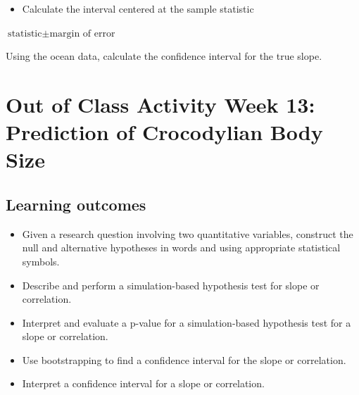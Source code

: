 \documentclass[
]{report}
\newenvironment{Shaded}{\begin{snugshade}}{\end{snugshade}}
\newcommand{\AttributeTok}[1]{\textcolor[rgb]{0.77,0.63,0.00}{#1}}
\newcommand{\CommentTok}[1]{\textcolor[rgb]{0.56,0.35,0.01}{\textit{#1}}}
\newcommand{\DecValTok}[1]{\textcolor[rgb]{0.00,0.00,0.81}{#1}}
\newcommand{\FunctionTok}[1]{\textcolor[rgb]{0.00,0.00,0.00}{#1}}
\newcommand{\NormalTok}[1]{#1}
\newcommand{\OtherTok}[1]{\textcolor[rgb]{0.56,0.35,0.01}{#1}}
\newcommand{\SpecialCharTok}[1]{\textcolor[rgb]{0.00,0.00,0.00}{#1}}
\providecommand{\tightlist}{%
  \setlength{\itemsep}{0pt}\setlength{\parskip}{0pt}}
\newcommand{\rgi}{\hspace{24pt}}  %
\begin{document}
\begin{itemize}
\tightlist
\item
  Calculate the interval centered at the sample statistic
\end{itemize}

\rgi \(\text{statistic} \pm \text{margin of error}\)

\vspace{0.8in}

\begin{Shaded}
\end{Shaded}

Using the ocean data, calculate the confidence interval for the true slope.

\vspace{1in}

\newpage

\hypertarget{out-of-class-activity-week-13-prediction-of-crocodylian-body-size}{%
\section{Out of Class Activity Week 13: Prediction of Crocodylian Body Size}\label{out-of-class-activity-week-13-prediction-of-crocodylian-body-size}}


\hypertarget{learning-outcomes-8}{%
\subsection{Learning outcomes}\label{learning-outcomes-8}}

\begin{itemize}
\item
  Given a research question involving two quantitative variables, construct the null and alternative hypotheses
  in words and using appropriate statistical symbols.
\item
  Describe and perform a simulation-based hypothesis test for slope or correlation.
\item
  Interpret and evaluate a p-value for a simulation-based hypothesis test for a slope or correlation.
\item
  Use bootstrapping to find a confidence interval for the slope or correlation.
\item
  Interpret a confidence interval for a slope or correlation.
\end{itemize}
\end{document}
